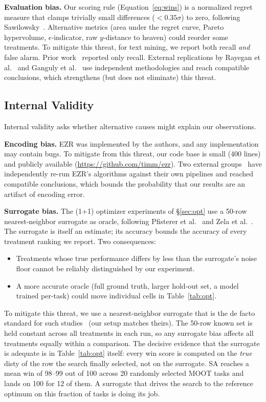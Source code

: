 \documentclass[AMA,STIX2COL]{WileyNJDv5}
\newcommand{\IT}{{\sffamily EZR}}
\begin{document}
{\textbf{Evaluation bias.} Our scoring rule (Equation~\ref{eq:wins})
is a normalized regret measure that clamps trivially small
differences \mbox{($<0.35\sigma$)} to zero, following
Sawilowsky~\cite{sawilowsky2009new}. Alternative metrics
(area under the regret curve, Pareto hypervolume,
$\epsilon$-indicator, raw $y$-distance to heaven) could
reorder some treatments.
To mitigate this threat, for text mining, we report both recall
{\em and} false alarm. Prior
work~\cite{yu2018total} reported only recall. External
replications by Rayegan et al.~\cite{Amiraliminimaldata}
and Ganguly et al.~\cite{ganguly2026lowgodatalightse} use
independent methodologies and reach compatible conclusions,
which strengthens (but does not eliminate) this threat.

\subsection{Internal Validity}
Internal validity asks whether alternative causes might
explain our observations.

\textbf{Encoding bias.} \IT{} was implemented by the authors, and
any implementation may contain bugs.
To mitigate from this threat,
our code base is small (400 lines) and
publicly available
(\url{https://github.com/timm/ezr}). Two external
groups~\cite{Amiraliminimaldata,ganguly2026lowgodatalightse}
have independently re-run \IT{}'s algorithms against their
own pipelines and reached compatible conclusions, which
bounds the probability that our results are an artifact of
encoding error.

\textbf{Surrogate bias.} The (1+1) optimizer experiments of
\S\ref{sec:opt} use a 50-row nearest-neighbor surrogate as
oracle, following Pfisterer et
al.~\cite{pfisterer2022yahpo} and Zela et
al.~\cite{zela2020surrogate}. The surrogate is itself an
estimate; its accuracy bounds the accuracy of every
treatment ranking we report. Two consequences:
\begin{itemize}
\item Treatments whose true performance differs by less
than the surrogate's noise floor cannot be reliably
distinguished by our experiment.
\item A more accurate oracle (full ground truth, larger
hold-out set, a model trained per-task) could move
individual cells in Table~\ref{tab:opt}.
\end{itemize}
To mitigate this threat, we use a nearest-neighbor surrogate
that is the de facto standard for such
studies~\cite{pfisterer2022yahpo, zela2020surrogate} (our
setup matches theirs). The 50-row known set is held constant
across all treatments in each run, so any surrogate bias
affects all treatments equally within a comparison.
The decisive evidence that the surrogate is adequate is in
Table~\ref{tab:opt} itself: every \textsf{win} score is
computed on the {\em true} \textsf{disty} of the row the
search finally selected, not on the surrogate. SA reaches a
mean win of 98--99 out of 100 across 20 randomly selected
MOOT tasks and lands on 100 for 12 of them. A surrogate
that drives the search to the reference optimum on this
fraction of tasks is doing its job. 
}
\end{document}

